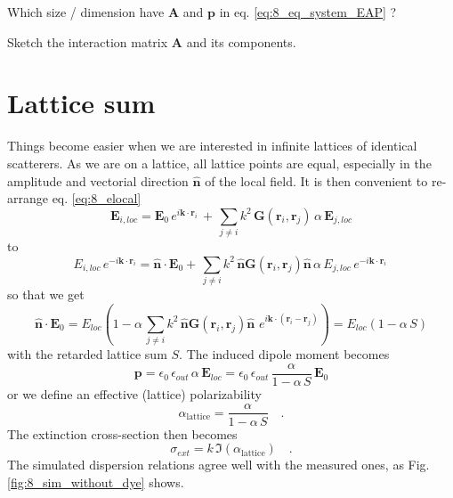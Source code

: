  
\begin{questions} 
  \item Which size / dimension have $ \mathbf{A}$ and $\mathbf{p}$ in eq. \ref{eq:8_eq_system_EAP} ?
  \item Sketch the interaction matrix $ \mathbf{A}$ and its components.
  \end{questions}
  
 

\section{Lattice sum}

Things become easier when we are interested in infinite lattices of identical scatterers. As we are on a lattice, all lattice points are equal, especially in the amplitude and vectorial direction $\mathbf{\hat{n}}$ of the local field. It is then 
 convenient to re-arrange eq. \ref{eq:8_elocal}
\begin{equation}
\mathbf{E}_{i, loc} =\mathbf{E}_{0} \, e^{i \mathbf{k} \cdot \mathbf{r}_i} \, +  \, 
 \sum_{j \neq i} k^2 \, 
\mathbf{G}(\mathbf{r}_i, \mathbf{r}_j) \,    \alpha \, \mathbf{E}_{j,loc}
\end{equation}
to
\begin{equation}
E_{i, loc}  \, e^{-i \mathbf{k} \cdot \mathbf{r}_i} =\mathbf{\hat{n}} \cdot \mathbf{E}_{0}  +  \, 
 \sum_{j \neq i} k^2 \, 
 \mathbf{\hat{n}} \mathbf{G}(\mathbf{r}_i, \mathbf{r}_j)  \mathbf{\hat{n}}\,    \alpha \, E_{j,loc} \, e^{-i \mathbf{k} \cdot \mathbf{r}_i} \,
\end{equation}
so that we get
\begin{equation}
\mathbf{\hat{n}} \cdot \mathbf{E}_{0} = 
E_{loc} \left( 1 -     \alpha  \,
 \sum_{j \neq i} k^2 \, 
 \mathbf{\hat{n}} \mathbf{G}(\mathbf{r}_i, \mathbf{r}_j)  \mathbf{\hat{n}}\,     \, e^{i \mathbf{k} \cdot ( \mathbf{r}_i - \mathbf{r}_j  ) } \right)
 = 
 {E}_{loc} \left( 1 -     \alpha  \, S \right)
\end{equation}
with the retarded lattice sum $S$. The induced
dipole moment becomes 
\begin{equation}
\mathbf{p} = \epsilon_0 \, \epsilon_{out} \, \alpha \, \mathbf{E}_{loc} =  \epsilon_0 \, \epsilon_{out} \, \frac{\alpha}{ 1 -     \alpha  \, S } \,
  \mathbf{E}_{0} 
\end{equation} 
or  we define an effective (lattice) polarizability
\begin{equation}
\alpha_\text{lattice} = \frac{\alpha}{ 1 -     \alpha  \, S }  \quad .
\end{equation} 
The extinction cross-section then becomes
\begin{equation}
\sigma_{ext} = k \, \Im(\alpha_\text{lattice})  \quad .
\end{equation}
The simulated dispersion relations agree well with the measured ones, as Fig.\ref{fig:8_sim_without_dye} shows.

